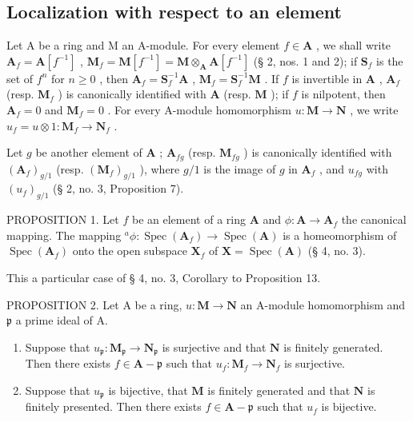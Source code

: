 \subsection{Localization with respect to an element}

Let A be a ring and M an A-module. For every element \(f \in \mathbf{A}\) , we shall write \(\mathbf{A}_f = \mathbf{A}[f^{-1}]\) , \(\mathbf{M}_f = \mathbf{M}[f^{-1}] = \mathbf{M} \otimes_{\mathbf{A}} \mathbf{A}[f^{-1}]\) (§ 2, nos. 1 and 2); if \(\mathbf{S}_f\) is the set of \(f^n\) for \(n \geqslant 0\) , then \(\mathbf{A}_f = \mathbf{S}_f^{-1}\mathbf{A}\) , \(\mathbf{M}_f = \mathbf{S}_f^{-1}\mathbf{M}\) . If \(f\) is invertible in \(\mathbf{A}\) , \(\mathbf{A}_f\) (resp. \(\mathbf{M}_f\) ) is canonically identified with \(\mathbf{A}\) (resp. \(\mathbf{M}\) ); if \(f\) is nilpotent, then \(\mathbf{A}_f = 0\) and \(\mathbf{M}_f = 0\) . For every A-module homomorphism \(u: \mathbf{M} \to \mathbf{N}\) , we write \(u_f = u \otimes 1: \mathbf{M}_f \to \mathbf{N}_f\) .

Let \(g\) be another element of \(\mathbf{A}\) ; \(\mathbf{A}_{fg}\) (resp. \(\mathbf{M}_{fg}\) ) is canonically identified with \((\mathbf{A}_f)_{g/1}\) (resp. \((\mathbf{M}_f)_{g/1}\) ), where \(g/1\) is the image of \(g\) in \(\mathbf{A}_f\) , and \(u_{fg}\) with \((u_f)_{g/1}\) (§ 2, no. 3, Proposition 7).

PROPOSITION 1. Let \(f\) be an element of a ring \(\mathbf{A}\) and \(\phi: \mathbf{A} \to \mathbf{A}_f\) the canonical mapping. The mapping \(^a\phi: \operatorname{Spec}(\mathbf{A}_f) \to \operatorname{Spec}(\mathbf{A})\) is a homeomorphism of \(\operatorname{Spec}(\mathbf{A}_f)\) onto the open subspace \(\mathbf{X}_f\) of \(\mathbf{X} = \operatorname{Spec}(\mathbf{A})\) (§ 4, no. 3).

This a particular case of § 4, no. 3, Corollary to Proposition 13.

PROPOSITION 2. Let A be a ring, \(u: \mathbf{M} \to \mathbf{N}\) an A-module homomorphism and \(\mathfrak{p}\) a prime ideal of A.

\begin{enumerate}
\def\labelenumi{(\roman{enumi})}
\item
  Suppose that \(u_{\mathfrak{p}} \colon \mathbf{M}_{\mathfrak{p}} \to \mathbf{N}_{\mathfrak{p}}\) is surjective and that \(\mathbf{N}\) is finitely generated. Then there exists \(f \in \mathbf{A} - \mathfrak{p}\) such that \(u_{f} \colon \mathbf{M}_{f} \to \mathbf{N}_{f}\) is surjective.
\item
  Suppose that \(u_{\mathfrak{p}}\) is bijective, that \(\mathbf{M}\) is finitely generated and that \(\mathbf{N}\) is finitely presented. Then there exists \(f \in \mathbf{A} - \mathfrak{p}\) such that \(u_{f}\) is bijective.
\end{enumerate}

